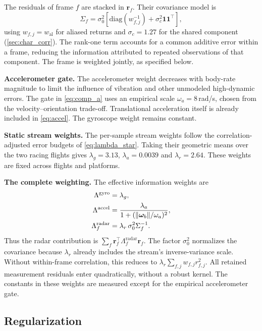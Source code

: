 The residuals of frame $f$ are stacked in $\mathbf{r}_f$.  Their
covariance model is
\begin{equation}
  \Sigma_f = \sigma_0^2\!\left[
    \mathrm{diag}(w_{f,j}^{-1})
    + \sigma_c^2\mathbf{1}\mathbf{1}^{\top}\right],
  \label{eq:frame_cov}
\end{equation}
using $w_{f,j}=w_{\mathrm{al}}$ for aliased returns and
$\sigma_c=1.27$ for the shared component (\autoref{sec:char_corr}).
The rank-one term accounts for a common additive error within a frame,
reducing the information attributed to repeated observations of that
component.  The frame is weighted jointly, as specified below.

\textbf{Accelerometer gate.}
The accelerometer weight decreases with body-rate magnitude to limit
the influence of vibration and other unmodeled high-dynamic errors.
The gate in \eqref{eq:comp_a} uses an empirical scale
$\omega_a=8$\,rad/s, chosen from the velocity--orientation trade-off.
Translational acceleration itself is already included in
\eqref{eq:accel}.  The gyroscope weight remains constant.

\textbf{Static stream weights.}
The per-sample stream weights follow the correlation-adjusted error
budgets of \eqref{eq:lambda_star}.  Taking their geometric means over
the two racing flights gives $\lambda_g=3.13$, $\lambda_a=0.0039$
and $\lambda_r=2.64$.  These weights are fixed across flights and
platforms.

\textbf{The complete weighting.}
The effective information weights are
\begin{align}
  \Lambda^{\mathrm{gyro}}  &= \lambda_g, \label{eq:comp_g}\\
  \Lambda^{\mathrm{accel}} &= \frac{\lambda_a}{1 + (\lVert\boldsymbol{\omega}_b\rVert/\omega_a)^2}, \label{eq:comp_a}\\
  \Lambda^{\mathrm{radar}}_f &= \lambda_r\,\sigma_0^2\Sigma_f^{-1}. \label{eq:comp_r}
\end{align}
Thus the radar contribution is
$\sum_f\mathbf{r}_f^{\top}\Lambda^{\mathrm{radar}}_f\mathbf{r}_f$.
The factor $\sigma_0^2$ normalizes the covariance because $\lambda_r$
already includes the stream's inverse-variance scale.  Without
within-frame correlation, this reduces to
$\lambda_r\sum_{f,j}w_{f,j}r_{f,j}^2$.
All retained measurement residuals enter quadratically, without a
robust kernel.  The constants in these weights are measured except
for the empirical accelerometer gate.

\subsection{Regularization}
\label{sec:reg}

